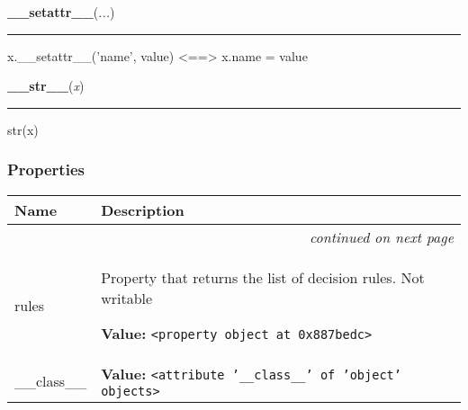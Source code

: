     \vspace{0.5ex}

    \begin{boxedminipage}{\textwidth}

    \raggedright \textbf{\_\_setattr\_\_}(\textit{...})

    \vspace{-1.5ex}

    \rule{\textwidth}{0.5\fboxrule}

x.{\_}{\_}setattr{\_}{\_}('name', value) {\textless}=={\textgreater} x.name = value
    \vspace{1ex}

    \end{boxedminipage}

    \label{object:__str__}

    \vspace{0.5ex}

    \begin{boxedminipage}{\textwidth}

    \raggedright \textbf{\_\_str\_\_}(\textit{x})

    \vspace{-1.5ex}

    \rule{\textwidth}{0.5\fboxrule}

str(x)
    \vspace{1ex}

    \end{boxedminipage}



  \subsubsection{Properties}

\begin{longtable}{|p{}|p{}|l}
\cline{1-2}
\cline{1-2} \centering \textbf{Name} & \centering \textbf{Description}& \\
\cline{1-2}
\endhead\cline{1-2}\multicolumn{3}{r}{\small\textit{continued on next page}}\\\endfoot\cline{1-2}
\endlastfoot\raggedright r\-u\-l\-e\-s\- & \raggedright Property that returns the list of decision rules. Not writable

\textbf{Value:} 
{\tt {\textless}property object at 0x887bedc{\textgreater}}&\\
\cline{1-2}
\raggedright \_\-\_\-c\-l\-a\-s\-s\-\_\-\_\- & \raggedright \textbf{Value:} 
{\tt {\textless}attribute '\_\_class\_\_' of 'object' objects{\textgreater}}&\\
\cline{1-2}
\end{longtable}

